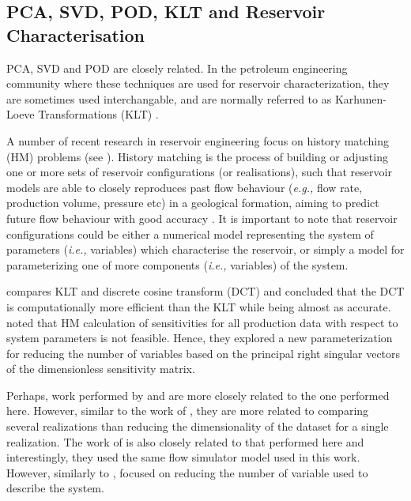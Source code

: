 \documentclass[preprint,12pt]{elsarticle}
\newcommand{\eg}{{\it e.g., }}
\newcommand{\ie}{{\it i.e., }}
\begin{document}
\subsection{PCA, SVD, POD, KLT and Reservoir Characterisation}\label{section:reservoir_char}

PCA, SVD and POD are closely related. In the petroleum engineering community where these techniques are used for reservoir characterization, they are sometimes used interchangable, and are normally referred to as Karhunen-Loeve Transformations (KLT) \cite{Jafarpour_2009}.

A number of recent research in reservoir engineering focus on  history matching (HM) problems (see \cite{Afra_2013, Insuasty_2017, Jafarpour_2009, Tavakoli_2010, Xiao_2018}). History matching is the process of building or adjusting one or more sets of reservoir configurations (or realisations), such that reservoir models are able to closely reproduces past flow behaviour (\eg flow rate, production volume, pressure etc) in a geological formation, aiming to predict future flow behaviour with good accuracy \cite{Rwechungura_2011}. It is important to note that reservoir configurations could be either a numerical model representing the system of parameters (\ie{variables}) which characterise the reservoir, or simply a model for parameterizing one of more components (\ie{variables}) of the system.

\citet{Jafarpour_2009} compares KLT and discrete cosine transform (DCT) and concluded that the DCT is computationally more efficient than the KLT while being almost as accurate. \citet{Tavakoli_2010} noted that HM calculation of sensitivities for all production data with respect to system parameters is not feasible. Hence, they explored a new parameterization for reducing the number of variables based on the principal right singular vectors of the dimensionless sensitivity matrix.

Perhaps, work performed by \citet{Afra_2013,Afra_2016,Afra_2014} and \citet{Insuasty_2017} are more closely related to the one performed here. However, similar to the work of \citet{Jafarpour_2009}, they are more related to comparing several realizations than reducing the dimensionality of the dataset for a single realization. The work of \citet{Xiao_2018} is also closely related to that performed here and interestingly, they used the same flow simulator model used in this work. However, similarly to \citet{Tavakoli_2010}, \citeauthor{Xiao_2018} focused on reducing the number of variable used to describe the system.
\end{document}
